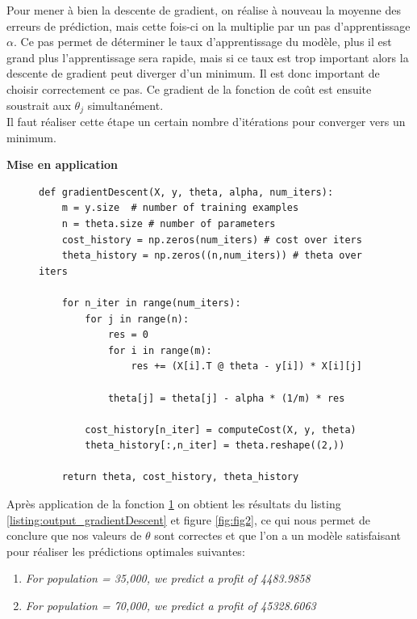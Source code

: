 Pour mener à bien la descente de gradient, on réalise à nouveau la moyenne des erreurs de prédiction, mais cette fois-ci on la multiplie par un pas d'apprentissage $\alpha$. Ce pas permet de déterminer le taux d'apprentissage du modèle, 
plus il est grand plus l'apprentissage sera rapide, mais si ce taux est trop important alors la descente de gradient peut diverger d'un minimum. Il est donc important de choisir correctement ce pas. Ce gradient de la fonction de coût est ensuite
soustrait aux $\theta_j$ simultanément. \\
Il faut réaliser cette étape un certain nombre d'itérations pour converger vers un minimum.

\clearpage

\vspace{.5cm}
\noindent
\textbf{Mise en application}
\vspace{.2cm}

\begin{figure}[!h]
\begin{verbatim}
def gradientDescent(X, y, theta, alpha, num_iters):  
    m = y.size  # number of training examples
    n = theta.size # number of parameters
    cost_history = np.zeros(num_iters) # cost over iters
    theta_history = np.zeros((n,num_iters)) # theta over iters

    for n_iter in range(num_iters):
        for j in range(n):
            res = 0
            for i in range(m):
                res += (X[i].T @ theta - y[i]) * X[i][j]
            
            theta[j] = theta[j] - alpha * (1/m) * res

        cost_history[n_iter] = computeCost(X, y, theta)
        theta_history[:,n_iter] = theta.reshape((2,))
    
    return theta, cost_history, theta_history
\end{verbatim}   
\label{listing:gradient_descente}
\end{figure}

Après application de la fonction \ref{listing:gradient_descente} on obtient les résultats du listing \ref{listing:output_gradientDescent} et figure \ref{fig:fig2}, ce qui nous permet de conclure que nos valeurs de $\theta$ sont correctes et que l'on a un modèle satisfaisant pour 
réaliser les prédictions optimales suivantes:

\begin{enumerate}
    \item \textit{For population = 35,000, we predict a profit of 4483.9858}
    \item \textit{For population = 70,000, we predict a profit of 45328.6063}
\end{enumerate}

